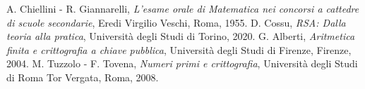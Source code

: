 \begin{thebibliography}{99}
 A. Chiellini - R. Giannarelli, \emph{L'esame orale di Matematica nei concorsi a cattedre di scuole secondarie}, Eredi Virgilio Veschi, Roma, 1955.
 D. Cossu, \emph{RSA: Dalla teoria alla pratica}, Università degli Studi di Torino, 2020.
 G. Alberti, \emph{Aritmetica finita e crittografia a chiave pubblica}, Università degli Studi di Firenze, Firenze, 2004.
 M. Tuzzolo - F. Tovena, \emph{Numeri primi e crittografia}, Università degli Studi di Roma Tor Vergata, Roma, 2008.
\end{thebibliography}